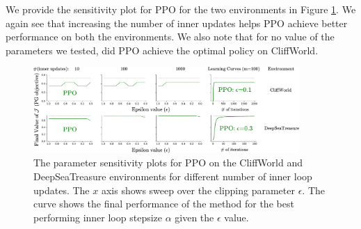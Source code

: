 \documentclass[a4paper, 10pt]{article}
\begin{document}
We provide the sensitivity plot for PPO for the two environments in Figure \ref{fig:ppo_plots}. We again see that increasing the number of inner updates helps PPO achieve better performance on both the environments. We also note that for no value of the parameters we tested, did PPO achieve the optimal policy on CliffWorld.

\begin{figure}[!tbp]
    \centering
    \includegraphics[width=0.9\textwidth]{ppo.pdf}
    \caption{The parameter sensitivity plots for PPO on the CliffWorld and DeepSeaTreasure environments for different number of inner loop updates. The $x$ axis shows sweep over the clipping parameter $\epsilon$. The curve shows the final performance of the method for the best performing inner loop stepsize $\alpha$ given the $\epsilon$ value.
    \label{fig:ppo_plots}}
\end{figure}
\end{document}
